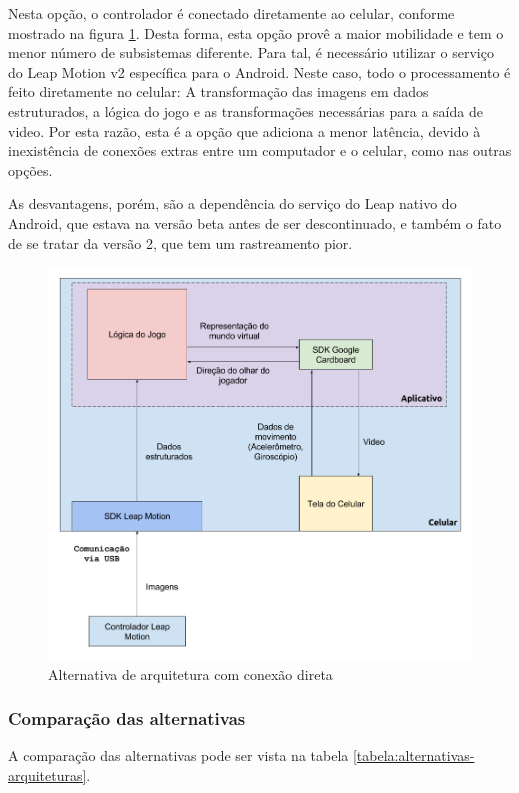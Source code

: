 Nesta opção, o controlador é conectado diretamente ao celular, conforme mostrado na figura \ref{fig:arquitetura-leap-android}. Desta forma, esta opção provê a maior mobilidade e tem o menor número de subsistemas diferente. Para tal, é necessário utilizar o serviço do Leap Motion v2 específica para o Android. Neste caso, todo o processamento é feito diretamente no celular: A transformação das imagens em dados estruturados, a lógica do jogo e as transformações necessárias para a saída de video. Por esta razão, esta é a opção que adiciona a menor latência, devido à inexistência de conexões extras entre um computador e o celular, como nas outras opções.

As desvantagens, porém, são a dependência do serviço do Leap nativo do Android, que estava na versão beta antes de ser descontinuado, e também o fato de se tratar da versão 2, que tem um rastreamento pior.

\begin{figure}
	\centering
	\includegraphics[width=0.7\linewidth]{images/Arquitetura-leap-android}
	\caption{Alternativa de arquitetura com conexão direta}
	\label{fig:arquitetura-leap-android}
\end{figure}

\subsubsection{Comparação das alternativas}\label{subsubsec-arquiteturas-comparacao}

A comparação das alternativas pode ser vista na tabela \ref{tabela:alternativas-arquiteturas}.


